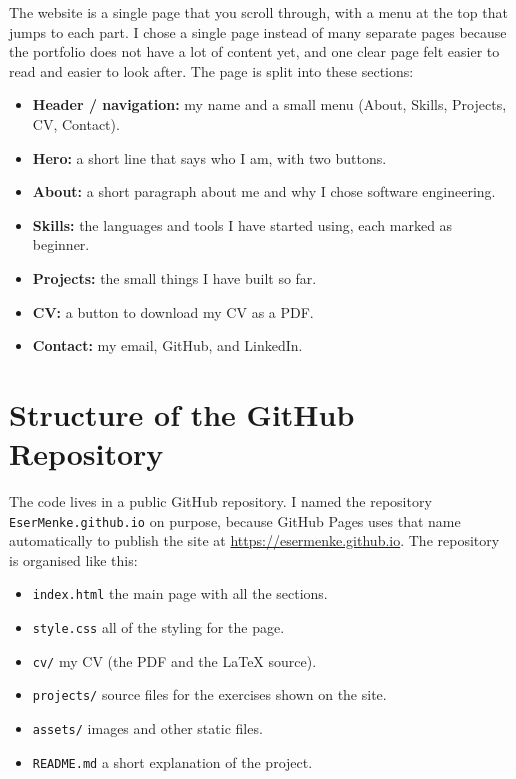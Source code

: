 \documentclass[11pt,a4paper]{article}
\begin{document}
The website is a single page that you scroll through, with a menu at the top that jumps to
each part. I chose a single page instead of many separate pages because the portfolio does
not have a lot of content yet, and one clear page felt easier to read and easier to look
after. The page is split into these sections:

\begin{itemize}[leftmargin=1.4em, itemsep=2pt, topsep=2pt]
  \item \textbf{Header / navigation:} my name and a small menu (About, Skills, Projects, CV, Contact).
  \item \textbf{Hero:} a short line that says who I am, with two buttons.
  \item \textbf{About:} a short paragraph about me and why I chose software engineering.
  \item \textbf{Skills:} the languages and tools I have started using, each marked as beginner.
  \item \textbf{Projects:} the small things I have built so far.
  \item \textbf{CV:} a button to download my CV as a PDF.
  \item \textbf{Contact:} my email, GitHub, and LinkedIn.
\end{itemize}

\section{Structure of the GitHub Repository}

The code lives in a public GitHub repository. I named the repository
\texttt{EserMenke.github.io} on purpose, because GitHub Pages uses that name automatically
to publish the site at \url{https://esermenke.github.io}. The repository is
organised like this:

\begin{itemize}[leftmargin=1.4em, itemsep=2pt, topsep=2pt]
  \item \texttt{index.html} \quad the main page with all the sections.
  \item \texttt{style.css} \quad all of the styling for the page.
  \item \texttt{cv/} \quad my CV (the PDF and the LaTeX source).
  \item \texttt{projects/} \quad source files for the exercises shown on the site.
  \item \texttt{assets/} \quad images and other static files.
  \item \texttt{README.md} \quad a short explanation of the project.
\end{itemize}
\end{document}
